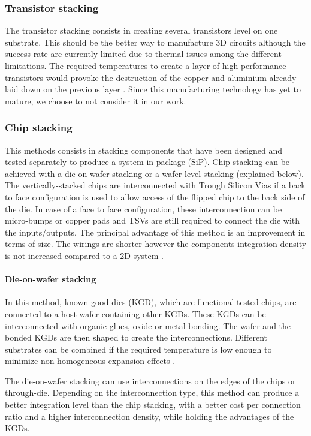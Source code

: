 \subsubsection{Transistor stacking}

The transistor stacking consists in creating several transistors level on one substrate. This should be the better way to manufacture 3D circuits although the success rate are currently limited due to thermal issues among the different limitations. The required temperatures to create a layer of high-performance transistors would provoke the destruction of the copper and aluminium already laid down on the previous layer \cite{659500}. Since this manufacturing technology has yet to mature, we choose to not consider it in our work.

\subsubsection{Chip stacking}

This methods consists in stacking components that have been designed and tested separately to produce a system-in-package (SiP). Chip stacking can be achieved with a die-on-wafer stacking or a wafer-level stacking (explained below). The vertically-stacked chips are interconnected with Trough Silicon Vias if a back to face configuration is used to allow access of the flipped chip to the back side of the die. In case of a face to face configuration, these interconnection can be micro-bumps or copper pads and TSVs are still required to connect the die with the inputs/outputs. The principal advantage of this method is an improvement in terms of size. The wirings are shorter however the components integration density is not increased compared to a 2D system \cite{659500}.

\paragraph{Die-on-wafer stacking}

In this method, known good dies (KGD), which are functional tested chips, are connected to a host wafer containing other KGDs. These KGDs can be interconnected with organic glues, oxide or metal bonding. The wafer and the bonded KGDs are then shaped to create the interconnections. Different substrates can be combined if the required temperature is low enough to minimize non-homogeneous expansion effects \cite{659500}.

The die-on-wafer stacking can use interconnections on the edges of the chips or through-die. Depending on the interconnection type, this method can produce a better integration level than the chip stacking, with a better cost per connection ratio and a higher interconnection density, while holding the advantages of the KGDs.

